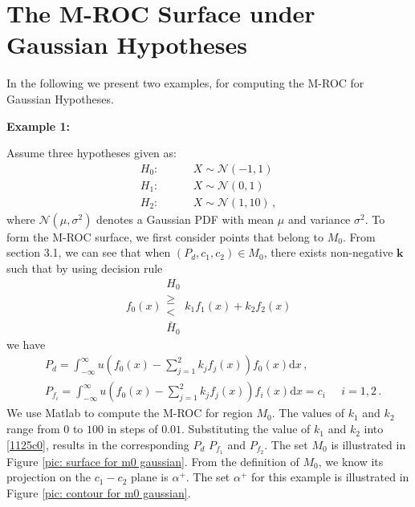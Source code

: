 \section{The M-ROC Surface  under Gaussian Hypotheses}
In the following we present two examples, for computing the M-ROC for Gaussian Hypotheses. 

\noindent \textbf{Example 1:}

Assume three hypotheses given as:
\begin{equation}
\label{equ: Gaussian Hypothesis}
\begin{split}
	H_0:\;\;\;\;\;\;\;\;&X \sim \mathcal{N}(-1,1)\\
    H_1:\;\;\;\;\;\;\;\;&X \sim \mathcal{N}(0,1)\\
    H_2:\;\;\;\;\;\;\;\;&X \sim \mathcal{N}(1,10)\,,
\end{split}
\end{equation}
where $\mathcal{N}(\mu,\sigma^2)$ denotes a Gaussian PDF with mean $\mu$ and variance $\sigma^2$.
To form the M-ROC surface, we first consider points that belong to $M_0$.
From section 3.1, we can see that when $(P_d, c_1, c_2) \in M_0$, there exists non-negative $\mathbf{k}$ such that by using decision rule 
\begin{equation}
f_0(x) \substack{H_0 \\ \geq \\ < \\ \bar{H}_0} k_1f_1(x) + k_2f_2(x)
\end{equation}
we have 
\begin{equation}
\begin{split}
\label{1125c0}
&P_d = \int_{-\infty}^{\infty} u(f_0(x) - \sum_{j=1}^{2}k_jf_j(x)) f_0(x)\mathrm{d}x    \,, \\
&P_{f_i} = \int_{-\infty}^{\infty} u(f_0(x) - \sum_{j=1}^{2}k_jf_j(x)) f_i(x) \mathrm{d}x = c_i\;\;\;\;\;    i=1, 2\,.
\end{split}
\end{equation}
We use Matlab to compute the M-ROC for region $M_0$. The values of $k_1$ and $k_2$ range from $0$ to $100$ in steps of $0.01$. Substituting the value of $k_1$ and $k_2$ into \eqref{1125c0}, results in the corresponding $P_d$ $P_{f_1}$ and $P_{f_2}$.  The set $M_0$ is illustrated in Figure \ref{pic: surface for m0 gaussian}. 
From the definition of $M_0$, we know its projection on the $c_1-c_2$ plane is $\alpha^+$.  
 The set $\alpha^+$ for this example is illustrated in Figure \ref{pic: contour for m0 gaussian}. 

